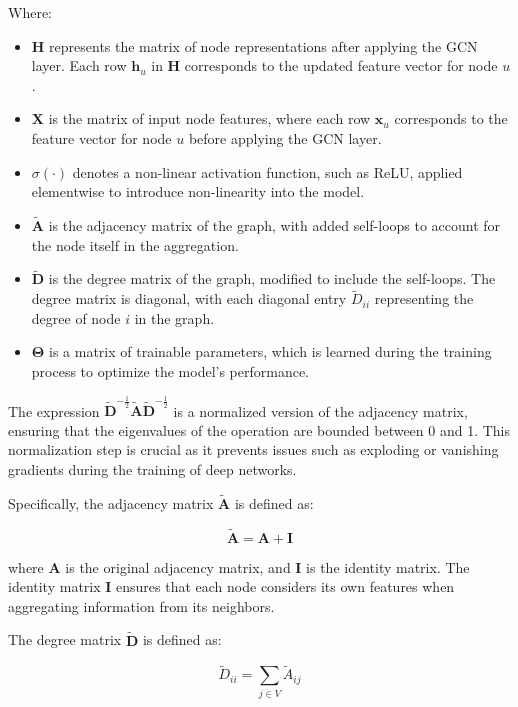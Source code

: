 Where:
\begin{itemize}
    \item \( \mathbf{H} \) represents the matrix of node representations after applying the GCN layer. Each row \( \mathbf{h}_u \) in \( \mathbf{H} \) corresponds to the updated feature vector for node \( u \). 
    \item \( \mathbf{X} \) is the matrix of input node features, where each row \( \mathbf{x}_u \) corresponds to the feature vector for node \( u \) before applying the GCN layer. 
    \item \( \sigma(\cdot) \) denotes a non-linear activation function, such as ReLU, applied elementwise to introduce non-linearity into the model. 
    \item \( \tilde{\mathbf{A}} \) is the adjacency matrix of the graph, with added self-loops to account for the node itself in the aggregation. 
    \item \( \tilde{\mathbf{D}} \) is the degree matrix of the graph, modified to include the self-loops. The degree matrix is diagonal, with each diagonal entry \( \tilde{D}_{ii} \) representing the degree of node \( i \) in the graph. 
    \item \( \mathbf{\Theta} \) is a matrix of trainable parameters, which is learned during the training process to optimize the model's performance.


\end{itemize}

The expression \( \tilde{\mathbf{D}}^{-\frac{1}{2}} \tilde{\mathbf{A}} \tilde{\mathbf{D}}^{-\frac{1}{2}} \) is a normalized version of the adjacency matrix, ensuring that the eigenvalues of the operation are bounded between 0 and 1. This normalization step is crucial as it prevents issues such as exploding or vanishing gradients during the training of deep networks.

Specifically, the adjacency matrix \( \tilde{\mathbf{A}} \) is defined as:

\[
\tilde{\mathbf{A}} = \mathbf{A} + \mathbf{I}
\]

where \( \mathbf{A} \) is the original adjacency matrix, and \( \mathbf{I} \) is the identity matrix. The identity matrix \( \mathbf{I} \) ensures that each node considers its own features when aggregating information from its neighbors.

The degree matrix \( \tilde{\mathbf{D}} \) is defined as:

\[
\tilde{D}_{ii} = \sum_{j \in V} \tilde{A}_{ij}
\]

